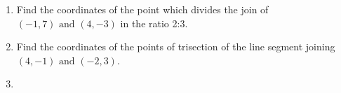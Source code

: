 \begin{enumerate}[label=\thesection.\arabic*,ref=\thesection.\theenumi]

\item Find the coordinates of the point which divides the join of $(-1,7) \text{ and } (4,-3)$ in the ratio 2:3.
	\\
		\solution
	
\item Find the coordinates of the points of trisection of the line segment joining $(4,-1) \text{ and } (-2,3)$.
	\\
		\solution
	
\item

      

\end{enumerate}
